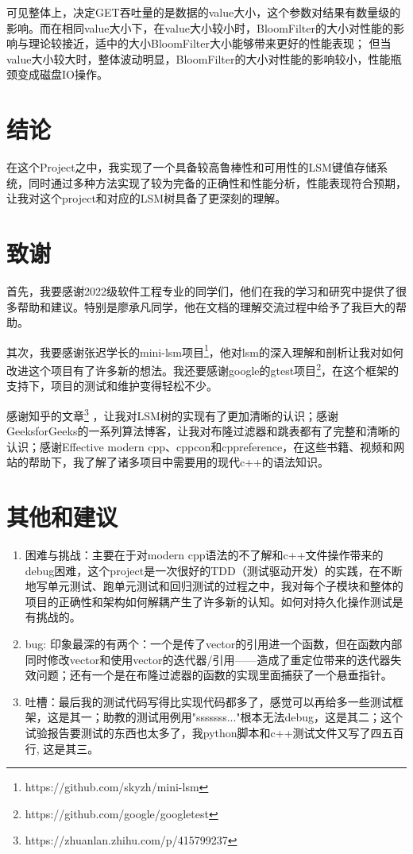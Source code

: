 \documentclass[UTF8]{article}
\begin{document}
可见整体上，决定GET吞吐量的是数据的value大小，这个参数对结果有数量级的影响。而在相同value大小下，在value大小较小时，BloomFilter的大小对性能的影响与理论较接近，适中的大小BloomFilter大小能够带来更好的性能表现；
但当value大小较大时，整体波动明显，BloomFilter的大小对性能的影响较小，性能瓶颈变成磁盘IO操作。
\section{结论}
在这个Project之中，我实现了一个具备较高鲁棒性和可用性的LSM键值存储系统，同时通过多种方法实现了较为完备的正确性和性能分析，性能表现符合预期，让我对这个project和对应的LSM树具备了更深刻的理解。

\section{致谢}
首先，我要感谢2022级软件工程专业的同学们，他们在我的学习和研究中提供了很多帮助和建议。特别是廖承凡同学，他在文档的理解交流过程中给予了我巨大的帮助。

其次，我要感谢张迟学长的mini-lsm项目\footnote{https://github.com/skyzh/mini-lsm}，他对lsm的深入理解和剖析让我对如何改进这个项目有了许多新的想法。我还要感谢google的gtest项目\footnote{https://github.com/google/googletest}，在这个框架的支持下，项目的测试和维护变得轻松不少。

感谢知乎的文章\footnote{https://zhuanlan.zhihu.com/p/415799237} ，让我对LSM树的实现有了更加清晰的认识；感谢GeeksforGeeks的一系列算法博客，让我对布隆过滤器和跳表都有了完整和清晰的认识；感谢Effective modern cpp、cppcon和cppreference，在这些书籍、视频和网站的帮助下，我了解了诸多项目中需要用的现代c++的语法知识。

\section{其他和建议}
\begin{enumerate}
    \item 困难与挑战：主要在于对modern cpp语法的不了解和c++文件操作带来的debug困难，这个project是一次很好的TDD（测试驱动开发）的实践，在不断地写单元测试、跑单元测试和回归测试的过程之中，我对每个子模块和整体的项目的正确性和架构如何解耦产生了许多新的认知。如何对持久化操作测试是有挑战的。
    \item bug: 印象最深的有两个：一个是传了vector的引用进一个函数，但在函数内部同时修改vector和使用vector的迭代器/引用——造成了重定位带来的迭代器失效问题；还有一个是在布隆过滤器的函数的实现里面捕获了一个悬垂指针。
    \item 吐槽：最后我的测试代码写得比实现代码都多了，感觉可以再给多一些测试框架，这是其一；助教的测试用例用"sssssss..."根本无法debug，这是其二；这个试验报告要测试的东西也太多了，我python脚本和c++测试文件又写了四五百行, 这是其三。
\end{enumerate}
\end{document}
